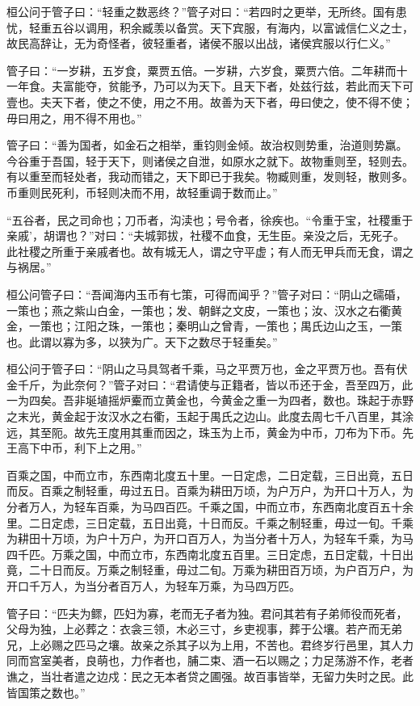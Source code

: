 \documentclass[]{article}
\begin{document}
桓公问于管子曰：``轻重之数恶终？''管子对曰：``若四时之更举，无所终。国有患忧，轻重五谷以调用，积余臧羡以备赏。天下宾服，有海内，以富诚信仁义之士，故民高辞让，无为奇怪者，彼轻重者，诸侯不服以出战，诸侯宾服以行仁义。''

管子曰：``一岁耕，五岁食，粟贾五倍。一岁耕，六岁食，粟贾六倍。二年耕而十一年食。夫富能夺，贫能予，乃可以为天下。且天下者，处兹行兹，若此而天下可壹也。夫天下者，使之不使，用之不用。故善为天下者，毋曰使之，使不得不使；毋曰用之，用不得不用也。''

管子曰：``善为国者，如金石之相举，重钧则金倾。故治权则势重，治道则势羸。今谷重于吾国，轻于天下，则诸侯之自泄，如原水之就下。故物重则至，轻则去。有以重至而轻处者，我动而错之，天下即已于我矣。物臧则重，发则轻，散则多。币重则民死利，币轻则决而不用，故轻重调于数而止。''

``五谷者，民之司命也；刀币者，沟渎也；号令者，徐疾也。``令重于宝，社稷重于亲戚'，胡谓也？''对曰：``夫城郭拔，社稷不血食，无生臣。亲没之后，无死子。此社稷之所重于亲戚者也。故有城无人，谓之守平虚；有人而无甲兵而无食，谓之与祸居。''

桓公问管子曰：``吾闻海内玉币有七策，可得而闻乎？''管子对曰：``阴山之礝碈，一策也；燕之紫山白金，一策也；发、朝鲜之文皮，一策也；汝、汉水之右衢黄金，一策也；江阳之珠，一策也；秦明山之曾青，一策也；禺氏边山之玉，一策也。此谓以寡为多，以狭为广。天下之数尽于轻重矣。''

桓公问于管子曰：``阴山之马具驾者千乘，马之平贾万也，金之平贾万也。吾有伏金千斤，为此奈何？''管子对曰：``君请使与正籍者，皆以币还于金，吾至四万，此一为四矣。吾非埏埴摇炉櫜而立黄金也，今黄金之重一为四者，数也。珠起于赤野之末光，黄金起于汝汉水之右衢，玉起于禺氏之边山。此度去周七千八百里，其涂远，其至阨。故先王度用其重而因之，珠玉为上币，黄金为中币，刀布为下币。先王高下中币，利下上之用。''

百乘之国，中而立市，东西南北度五十里。一日定虑，二日定载，三日出竟，五日而反。百乘之制轻重，毋过五日。百乘为耕田万顷，为户万户，为开口十万人，为分者万人，为轻车百乘，为马四百匹。千乘之国，中而立市，东西南北度百五十余里。二日定虑，三日定载，五日出竟，十日而反。千乘之制轻重，毋过一旬。千乘为耕田十万顷，为户十万户，为开口百万人，为当分者十万人，为轻车千乘，为马四千匹。万乘之国，中而立市，东西南北度五百里。三日定虑，五日定载，十日出竟，二十日而反。万乘之制轻重，毋过二旬。万乘为耕田百万顷，为户百万户，为开口千万人，为当分者百万人，为轻车万乘，为马四万匹。

管子曰：``匹夫为鳏，匹妇为寡，老而无子者为独。君问其若有子弟师役而死者，父母为独，上必葬之：衣衾三领，木必三寸，乡吏视事，葬于公壤。若产而无弟兄，上必赐之匹马之壤。故亲之杀其子以为上用，不苦也。君终岁行邑里，其人力同而宫室美者，良萌也，力作者也，脯二束、酒一石以赐之；力足荡游不作，老者谯之，当壮者遣之边戍：民之无本者贷之圃强。故百事皆举，无留力失时之民。此皆国策之数也。''
\end{document}
